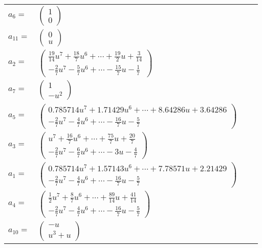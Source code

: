 \documentclass[1p]{elsarticle_modified}
\theoremstyle{definition}
\begin{document}
\begin{tabular}{m{7pt} m{180pt} m{7pt} m{180pt} }
\flushright $a_{6}=$&$\begin{pmatrix}1\\0\end{pmatrix}$ \\
\flushright $a_{11}=$&$\begin{pmatrix}0\\u\end{pmatrix}$ \\
\flushright $a_{2}=$&$\begin{pmatrix}\frac{19}{14} u^7+\frac{18}{7} u^6+\cdots+\frac{19}{2} u+\frac{3}{14}\\-\frac{2}{7} u^7-\frac{5}{7} u^6+\cdots-\frac{15}{7} u-\frac{1}{7}\end{pmatrix}$ \\
\flushright $a_{7}=$&$\begin{pmatrix}1\\- u^2\end{pmatrix}$ \\
\flushright $a_{5}=$&$\begin{pmatrix}0.785714 u^{7}+1.71429 u^{6}+\cdots+8.64286 u+3.64286\\-\frac{2}{7} u^7-\frac{4}{7} u^6+\cdots-\frac{16}{7} u-\frac{5}{7}\end{pmatrix}$ \\
\flushright $a_{3}=$&$\begin{pmatrix}u^7+\frac{16}{7} u^6+\cdots+\frac{75}{7} u+\frac{20}{7}\\-\frac{2}{7} u^7-\frac{6}{7} u^6+\cdots-3 u-\frac{4}{7}\end{pmatrix}$ \\
\flushright $a_{1}=$&$\begin{pmatrix}0.785714 u^{7}+1.57143 u^{6}+\cdots+7.78571 u+2.21429\\-\frac{2}{7} u^7-\frac{4}{7} u^6+\cdots-\frac{16}{7} u-\frac{5}{7}\end{pmatrix}$ \\
\flushright $a_{4}=$&$\begin{pmatrix}\frac{1}{2} u^7+\frac{8}{7} u^6+\cdots+\frac{89}{14} u+\frac{41}{14}\\-\frac{2}{7} u^7-\frac{4}{7} u^6+\cdots-\frac{16}{7} u-\frac{5}{7}\end{pmatrix}$ \\
\flushright $a_{10}=$&$\begin{pmatrix}- u\\u^3+u\end{pmatrix}$ \\

\end{tabular}
\end{document}
